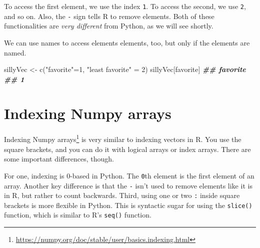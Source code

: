 \documentclass[
  12pt,
  krantz2]{krantz}
\makeatletter
\newenvironment{Shaded}{\begin{snugshade}}{\end{snugshade}}
\newcommand{\DecValTok}[1]{\textcolor[rgb]{0.06,0.06,0.06}{#1}}
\newcommand{\DocumentationTok}[1]{\textcolor[rgb]{0.37,0.37,0.37}{\textbf{\textit{#1}}}}
\newcommand{\FunctionTok}[1]{\textcolor[rgb]{0,0,0}{#1}}
\newcommand{\NormalTok}[1]{#1}
\newcommand{\OtherTok}[1]{\textcolor[rgb]{0.37,0.37,0.37}{#1}}
\newcommand{\StringTok}[1]{\textcolor[rgb]{0.5,0.5,0.5}{#1}}
\renewcommand{\href}[2]{#2\footnote{\url{#1}}}
\newenvironment{kframe}{%
\medskip{}
\setlength{\fboxsep}{.8em}
 \def\at@end@of@kframe{}%
 \ifinner\ifhmode%
  \def\at@end@of@kframe{\end{minipage}}%
  \begin{minipage}{\columnwidth}%
 \fi\fi%
 \def\FrameCommand##1{\hskip\@totalleftmargin \hskip-\fboxsep
 \colorbox{shadecolor}{##1}\hskip-\fboxsep
     \hskip-\linewidth \hskip-\@totalleftmargin \hskip\columnwidth}%
 \MakeFramed {\advance\hsize-\width
   \@totalleftmargin\z@ \linewidth\hsize
   \@setminipage}}%
 {\par\unskip\endMakeFramed%
 \at@end@of@kframe}
\renewenvironment{Shaded}{\begin{kframe}}{\end{kframe}}
\makeatother
\begin{document}
To access the first element, we use the index \texttt{1}. To access the second, we use \texttt{2}, and so on. Also, the \texttt{-} sign tells R to remove elements. Both of these functionalities are \emph{very different} from Python, as we will see shortly.

We can use names to access elements elements, too, but only if the elements are named.

\begin{Shaded}
\begin{Highlighting}[]
\NormalTok{sillyVec }\OtherTok{\textless{}{-}} \FunctionTok{c}\NormalTok{(}\StringTok{"favorite"}\OtherTok{=}\DecValTok{1}\NormalTok{, }\StringTok{"least favorite"} \OtherTok{=} \DecValTok{2}\NormalTok{)}
\NormalTok{sillyVec[}\StringTok{\textquotesingle{}favorite\textquotesingle{}}\NormalTok{]}
\DocumentationTok{\#\# favorite }
\DocumentationTok{\#\#        1}
\end{Highlighting}
\end{Shaded}

\hypertarget{indexing-numpy-arrays}{%
\section{Indexing Numpy arrays}\label{indexing-numpy-arrays}}

\href{https://numpy.org/doc/stable/user/basics.indexing.html}{Indexing Numpy arrays} is very similar to indexing vectors in R. You use the square brackets, and you can do it with logical arrays or index arrays. There are some important differences, though.

For one, indexing is 0-based in Python. The \texttt{0}th element is the first element of an array. Another key difference is that the \texttt{-} isn't used to remove elements like it is in R, but rather to count backwards. Third, using one or two \texttt{:} inside square brackets is more flexible in Python. This is syntactic sugar for using the \texttt{slice()} function, which is similar to R's \texttt{seq()} function.
\end{document}
